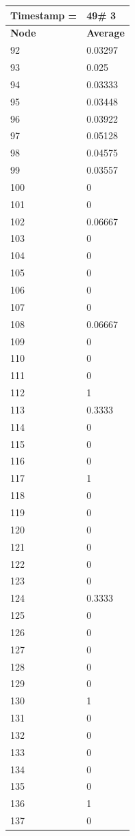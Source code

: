 \begin{tabular}{|l||l|}
\hline
\textbf{Timestamp =} & \textbf{49}\# 3\\\hline
	\textbf{Node} & \textbf{Average} \\ \hline
\hline
	92 & 0.03297 \\ \hline
	93 & 0.025 \\ \hline
	94 & 0.03333 \\ \hline
	95 & 0.03448 \\ \hline
	96 & 0.03922 \\ \hline
	97 & 0.05128 \\ \hline
	98 & 0.04575 \\ \hline
	99 & 0.03557 \\ \hline
	100 & 0 \\ \hline
	101 & 0 \\ \hline
	102 & 0.06667 \\ \hline
	103 & 0 \\ \hline
	104 & 0 \\ \hline
	105 & 0 \\ \hline
	106 & 0 \\ \hline
	107 & 0 \\ \hline
	108 & 0.06667 \\ \hline
	109 & 0 \\ \hline
	110 & 0 \\ \hline
	111 & 0 \\ \hline
	112 & 1 \\ \hline
	113 & 0.3333 \\ \hline
	114 & 0 \\ \hline
	115 & 0 \\ \hline
	116 & 0 \\ \hline
	117 & 1 \\ \hline
	118 & 0 \\ \hline
	119 & 0 \\ \hline
	120 & 0 \\ \hline
	121 & 0 \\ \hline
	122 & 0 \\ \hline
	123 & 0 \\ \hline
	124 & 0.3333 \\ \hline
	125 & 0 \\ \hline
	126 & 0 \\ \hline
	127 & 0 \\ \hline
	128 & 0 \\ \hline
	129 & 0 \\ \hline
	130 & 1 \\ \hline
	131 & 0 \\ \hline
	132 & 0 \\ \hline
	133 & 0 \\ \hline
	134 & 0 \\ \hline
	135 & 0 \\ \hline
	136 & 1 \\ \hline
	137 & 0 \\ \hline
\end{tabular}


